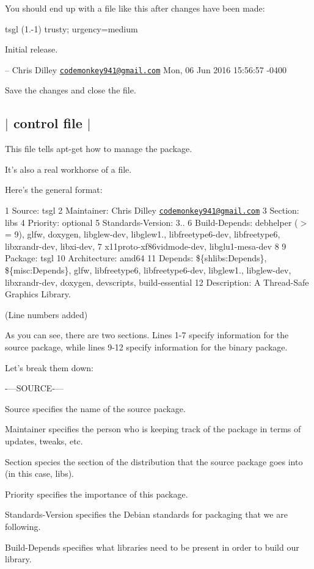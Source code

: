 You should end up with a file like this after changes have been made\-:

tsgl (1.-\/1) trusty; urgency=medium


\begin{DoxyItemize}
\item Initial release.
\end{DoxyItemize}

-- Chris Dilley \href{mailto:codemonkey941@gmail.com}{\tt codemonkey941@gmail.\-com} Mon, 06 Jun 2016 15\-:56\-:57 -\/0400

Save the changes and close the file. 

 \subsection*{$\vert$ control file $\vert$ }

This file tells apt-\/get how to manage the package.

It's also a real workhorse of a file.

Here's the general format\-:

1 Source\-: tsgl 2 Maintainer\-: Chris Dilley \href{mailto:codemonkey941@gmail.com}{\tt codemonkey941@gmail.\-com} 3 Section\-: libs 4 Priority\-: optional 5 Standards-\/\-Version\-: 3.. 6 Build-\/\-Depends\-: debhelper ($>$= 9), glfw, doxygen, libglew-\/dev, libglew1., libfreetype6-\/dev, libfreetype6, libxrandr-\/dev, libxi-\/dev, 7 x11proto-\/xf86vidmode-\/dev, libglu1-\/mesa-\/dev 8 9 Package\-: tsgl 10 Architecture\-: amd64 11 Depends\-: \$\{shlibs\-:Depends\}, \$\{misc\-:Depends\}, glfw, libfreetype6, libfreetype6-\/dev, libglew1., libglew-\/dev, libxrandr-\/dev, doxygen, devscripts, build-\/essential 12 Description\-: A Thread-\/\-Safe Graphics Library.

(Line numbers added)

As you can see, there are two sections. Lines 1-\/7 specify information for the source package, while lines 9-\/12 specify information for the binary package.

Let's break them down\-:

-\/---S\-O\-U\-R\-C\-E-\/---
\begin{DoxyItemize}
\item Source specifies the name of the source package.
\item Maintainer specifies the person who is keeping track of the package in terms of updates, tweaks, etc.
\item Section species the section of the distribution that the source package goes into (in this case, libs).
\item Priority specifies the importance of this package.
\item Standards-\/\-Version specifies the Debian standards for packaging that we are following.
\item Build-\/\-Depends specifies what libraries need to be present in order to build our library.
\end{DoxyItemize}

